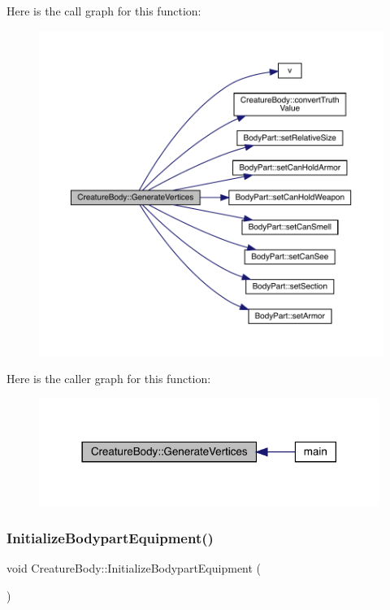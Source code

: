 Here is the call graph for this function\+:
\nopagebreak
\begin{figure}[H]
\begin{center}
\leavevmode
\includegraphics[width=350pt]{class_creature_body_af7047fb13005abbb9a816c0dd64af873_cgraph}
\end{center}
\end{figure}
Here is the caller graph for this function\+:
\nopagebreak
\begin{figure}[H]
\begin{center}
\leavevmode
\includegraphics[width=314pt]{class_creature_body_af7047fb13005abbb9a816c0dd64af873_icgraph}
\end{center}
\end{figure}
\mbox{\label{class_creature_body_af2b152c045862bb0fbc370b444bf98f0}} 
\subsubsection{\texorpdfstring{Initialize\+Bodypart\+Equipment()}{InitializeBodypartEquipment()}}
{\footnotesize\ttfamily void Creature\+Body\+::\+Initialize\+Bodypart\+Equipment (\begin{DoxyParamCaption}{ }\end{DoxyParamCaption})}

